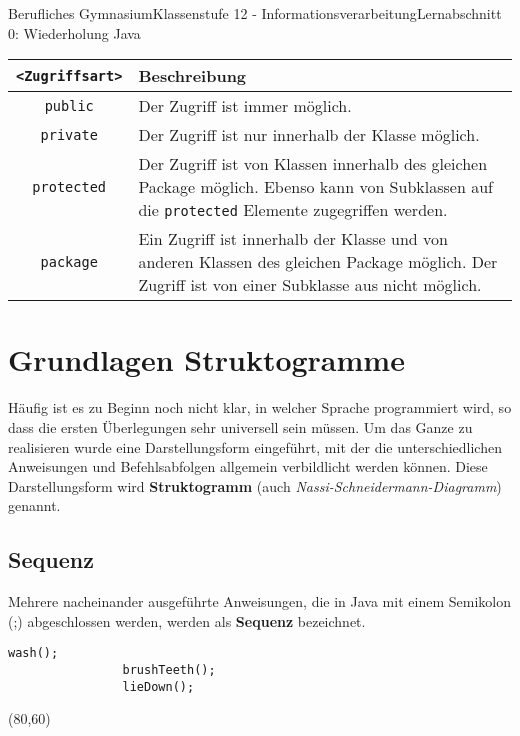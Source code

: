 \documentclass[11pt,oneside,openany,headings=optiontotoc,11pt,numbers=noenddot]{article}
\begin{document}
\begin{worksheet}{Berufliches Gymnasium}{Klassenstufe 12 - Informationsverarbeitung}{Lernabschnitt 0: Wiederholung Java}
\begin{tabularx}{\textwidth}{cX}
			\textbf{{\lstinline[style=JavaInputStyle]{<Zugriffsart>}}} & \textbf{Beschreibung}\\
			\hline
			\hline
			{\lstinline[style=JavaInputStyle]{public}} & Der Zugriff ist immer möglich. \\
			\hline
			{\lstinline[style=JavaInputStyle]{private}} & Der Zugriff ist nur innerhalb der Klasse möglich.\\
			\hline
			{\lstinline[style=JavaInputStyle]{protected}} & Der Zugriff ist von Klassen innerhalb des gleichen Package möglich. Ebenso kann von Subklassen auf die {\lstinline[style=JavaInputStyle]{protected}} Elemente zugegriffen werden. \\
			\hline
			\hline
			{\lstinline[style=JavaInputStyle]{package}} & Ein Zugriff ist innerhalb der Klasse und von anderen Klassen des gleichen Package möglich. Der Zugriff ist von einer Subklasse aus nicht möglich.\\
			\hline
			\hline
		\end{tabularx}
		\newpage
		\section{Grundlagen Struktogramme}
		Häufig ist es zu Beginn noch nicht klar, in welcher Sprache programmiert wird, so dass die ersten Überlegungen sehr universell sein müssen. Um das Ganze zu realisieren wurde eine Darstellungsform eingeführt, mit der die unterschiedlichen Anweisungen und Befehlsabfolgen allgemein verbildlicht werden können. Diese Darstellungsform wird \textbf{Struktogramm} (auch \textit{Nassi-Schneidermann-Diagramm}) genannt.
		\subsection{Sequenz}
		Mehrere nacheinander ausgeführte Anweisungen, die in Java mit einem Semikolon (;) abgeschlossen werden, werden als \textbf{Sequenz} bezeichnet.\\
		\par\noindent
		\begin{minipage}[t]{0.48\textwidth}
			\vspace*{0pt}
			\begin{lstlisting}[style=JavaInputStyle,frame=single]
				wash();
				brushTeeth();
				lieDown();
			\end{lstlisting}
		\end{minipage}
		\hfill
		\begin{minipage}[t]{0.48\textwidth}
			\vspace*{0pt}
			\begin{struktogramm}(80,60)
			\end{struktogramm}
		\end{minipage}

\end{worksheet}
\end{document}
